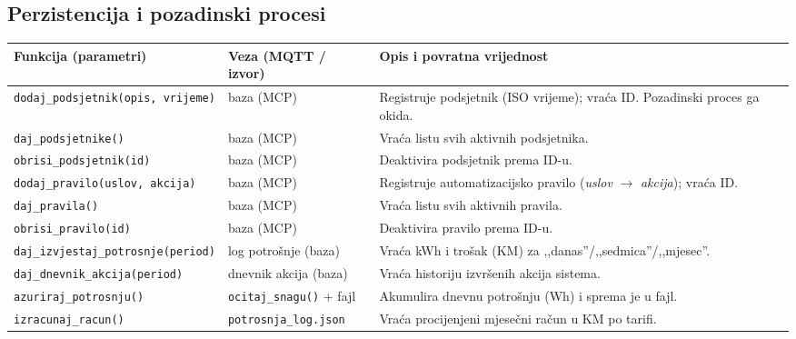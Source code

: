 \documentclass[11pt,a4paper]{article}
\begin{document}
\subsection{Perzistencija i pozadinski procesi}
{\small
      \begin{tabularx}{\textwidth}{@{}L{0.32\textwidth} L{0.20\textwidth} X@{}}
            \toprule
            \textbf{Funkcija (parametri)}              & \textbf{Veza (MQTT / izvor)}    & \textbf{Opis i povratna vrijednost}                                                       \\
            \midrule
            \texttt{dodaj\_podsjetnik(opis, vrijeme)}  & baza (MCP)                      & Registruje podsjetnik (ISO vrijeme); vraća ID. Pozadinski proces ga okida.                \\
            \texttt{daj\_podsjetnike()}                & baza (MCP)                      & Vraća listu svih aktivnih podsjetnika.                                                    \\
            \texttt{obrisi\_podsjetnik(id)}            & baza (MCP)                      & Deaktivira podsjetnik prema ID-u.                                                         \\
            \texttt{dodaj\_pravilo(uslov, akcija)}     & baza (MCP)                      & Registruje automatizacijsko pravilo (\emph{uslov} $\rightarrow$ \emph{akcija}); vraća ID. \\
            \texttt{daj\_pravila()}                    & baza (MCP)                      & Vraća listu svih aktivnih pravila.                                                        \\
            \texttt{obrisi\_pravilo(id)}               & baza (MCP)                      & Deaktivira pravilo prema ID-u.                                                            \\
            \texttt{daj\_izvjestaj\_potrosnje(period)} & log potrošnje (baza)            & Vraća kWh i trošak (KM) za ,,danas''/,,sedmica''/,,mjesec''.                              \\
            \texttt{daj\_dnevnik\_akcija(period)}      & dnevnik akcija (baza)           & Vraća historiju izvršenih akcija sistema.                                                 \\
            \texttt{azuriraj\_potrosnju()}             & \texttt{ocitaj\_snagu()} + fajl & Akumulira dnevnu potrošnju (Wh) i sprema je u fajl.                                       \\
            \texttt{izracunaj\_racun()}                & \texttt{potrosnja\_log.json}    & Vraća procijenjeni mjesečni račun u KM po tarifi.                                         \\
            \bottomrule
      \end{tabularx}
}
\end{document}
